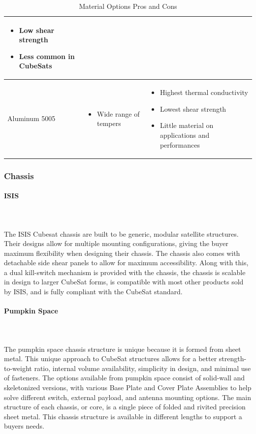 \begin{table}[H]
\begin{tabular}{|p{}|p{}|p{}|}
    \begin{itemize}
        \item Low shear strength
        \item Less common in CubeSats
    \end{itemize}
    \\
\hline
    Aluminum 5005
    &
    \begin{itemize}
        \item Wide range of tempers
    \end{itemize}
    &
    \begin{itemize}
        \item Highest thermal conductivity
        \item Lowest shear strength
        \item Little material on applications and performances
    \end{itemize}
    \\
\hline
\end{tabular}
\caption{Material Options Pros and Cons}
\label{tbl:Material_ProCon}
\end{table}

\subsubsection{Chassis}

\paragraph{ISIS} ~\\~\\
The ISIS Cubesat chassis are built to be generic, modular satellite structures. Their designs allow for multiple mounting configurations, giving the buyer maximum flexibility when designing their chassis. The chassis also comes with detachable side shear panels to allow for maximum accessibility. Along with this, a dual kill-switch mechanism is provided with the chassis, the chassis is scalable in design to larger CubeSat forms, is compatible with most other products sold by ISIS, and is fully compliant with the CubeSat standard. \cite{isis2} 
\paragraph{Pumpkin Space} ~\\~\\
The pumpkin space chassis structure is unique because it is formed from sheet metal. This unique approach to CubeSat structures allows for a better strength-to-weight ratio, internal volume availability, simplicity in design, and minimal use of fasteners. The options available from pumpkin space consist of solid-wall and skeletonized versions, with various Base Plate and Cover Plate Assemblies to help solve different switch, external payload, and antenna mounting options. The main structure of each chassis, or core, is a single piece of folded and rivited precision sheet metal. This chassis structure is available in different lengths to support a buyers needs.\cite{pumpkin_space} 
